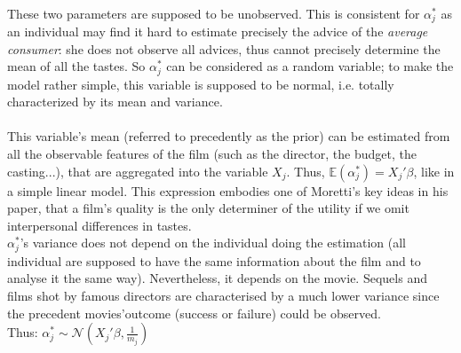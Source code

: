 	\\
	These two parameters are supposed to be unobserved. This is consistent for $\alpha_{j}^{*}$ as an individual may find it hard to estimate precisely the advice of the \textit{average consumer}: she does not observe all advices, thus cannot precisely determine the mean of all the tastes. So $\alpha_{j}^{*}$ can be considered as a random variable; to make the model rather simple, this variable is supposed to be normal, i.e. totally characterized by its mean and variance.\\
	\\
	This variable's mean (referred to precedently as the prior) can be estimated from all the observable features of the film (such as the director, the budget, the casting...), that are aggregated into the variable $X_{j}$. Thus, $\mathbb{E}(\alpha_{j}^{*})=X_{j}'\beta$, like in a simple linear model. This expression embodies one of Moretti's key ideas in his paper, that a film's quality is the only determiner of the utility if we omit interpersonal differences in tastes.\\
	$\alpha_{j}^{*}$'s variance does not depend on the individual doing the estimation (all individual are supposed to have the same information about the film and to analyse it the same way). Nevertheless, it depends on the movie. Sequels and films shot by famous directors are characterised by a much lower variance since the precedent movies'outcome (success or failure) could be observed.\\
	Thus: $\alpha_{j}^{*}\sim \mathcal{N}(X_{j}'\beta,\frac{1}{m_{j}})$\\
	
